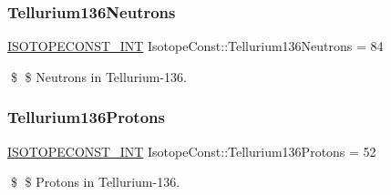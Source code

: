 \subsubsection{\texorpdfstring{Tellurium136\+Neutrons}{Tellurium136Neutrons}}
{\footnotesize\ttfamily \mbox{\hyperlink{group___isotope_const-_macros_ga5f18360b3e99483a35c32d789e62621c}{I\+S\+O\+T\+O\+P\+E\+C\+O\+N\+S\+T\+\_\+\+I\+NT}} Isotope\+Const\+::\+Tellurium136\+Neutrons = 84}

\$ \$ Neutrons in Tellurium-\/136. \mbox{\label{group___isotope_const-_tellurium-_te136_gac2575954059ee49ea954448fda9e04d1}} 
\subsubsection{\texorpdfstring{Tellurium136\+Protons}{Tellurium136Protons}}
{\footnotesize\ttfamily \mbox{\hyperlink{group___isotope_const-_macros_ga5f18360b3e99483a35c32d789e62621c}{I\+S\+O\+T\+O\+P\+E\+C\+O\+N\+S\+T\+\_\+\+I\+NT}} Isotope\+Const\+::\+Tellurium136\+Protons = 52}

\$ \$ Protons in Tellurium-\/136. 